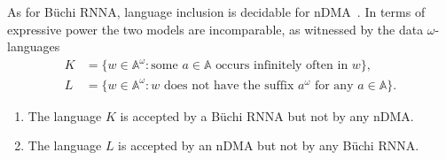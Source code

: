 \documentclass[10pt,a4paper]{amsart}
\newcommand{\compr}{:}
\numberwithin{equation}{section}
\newcommand{\+}[1]{\mathcal{#1}\xspace}
\newcommand{\names}{\mathbb{A}}
\theoremstyle{definition}
\begin{document}
As for Büchi RNNA, language inclusion is decidable for
nDMA~\cite[Thm. 4]{CianciaSammartino14}. In terms of expressive power the two models
are incomparable, as witnessed by the data $\omega$-languages
\begin{align*}
K &= \{ w\in \names^\omega\compr \text{some $a\in \names$ occurs  infinitely often in $w$} \},\\
L & =\{ w\in \names^\omega\compr \text{$w$ does not have  the suffix
        $a^\omega$ for any $a\in \names$} \}.
\end{align*}
\vspace{-0.6cm}
\begin{proposition}
  \begin{enumerate}
  \item The language $K$ is accepted by a Büchi RNNA but not by any nDMA.
    
  \item The language $L$ is accepted by an nDMA but not by any Büchi RNNA.
  \end{enumerate}
\end{proposition}
%
\end{document}
